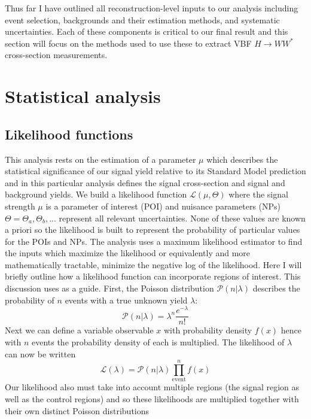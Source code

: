 Thus far I have outlined all reconstruction-level inputs to our analysis including event selection, backgrounds and their estimation methods, and systematic uncertainties. Each of these components is critical to our final result and this section will focus on the methods used to use these to extract VBF $H\rightarrow WW^*$ cross-section measurements. 
\section{Statistical analysis}
\subsection{Likelihood functions}
This analysis rests on the estimation of a parameter $\mu$ which describes the statistical significance of our signal yield relative to its Standard Model prediction and in this particular analysis defines the signal cross-section and signal and background yields. We build a likelihood function $\mathcal{L}(\mu,\Theta)$ where the signal strength $\mu$ is a parameter of interest (POI) and nuisance parameters (NPs) $\Theta=\Theta_a,\Theta_b,...$ represent all relevant uncertainties. None of these values are known a priori so the likelihood is built to represent the probability of particular values for the POIs and NPs. The analysis uses a maximum likelihood estimator to find the inputs which maximize the likelihood or equivalently and more mathematically tractable, minimize the negative log of the likelihood. Here I will briefly outline how a likelihood function can incorporate regions of interest. This discussion uses \cite{cranmer2015practical} as a guide. First, the Poisson distribution $\mathcal{P}(n|\lambda)$ describes the probability of $n$ events with a true unknown yield $\lambda$:
\begin{equation}
\mathcal{P}(n|\lambda)= \lambda^n\frac{e^{-\lambda}}{n!}
\end{equation}
Next we can define a variable observable $x$ with probability density $f(x)$ hence with $n$ events the probability density of each is multiplied. The likelihood of $\lambda$ can now be written
\begin{equation}
\mathcal{L}(\lambda)=\mathcal{P}(n|\lambda)\prod_{\text{event}}^n f(x)
\end{equation}
Our likelihood also must take into account multiple regions (the signal region as well as the control regions) and so these likelihoods are multiplied together with their own distinct Poisson distributions

